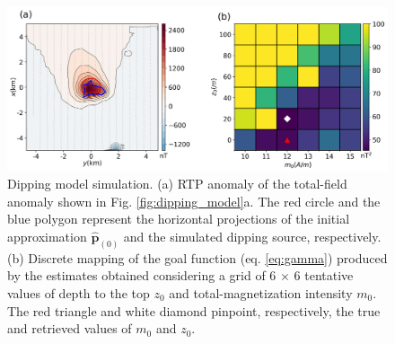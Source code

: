 \begin{figure}
    \centering
    \includegraphics[width=\linewidth]{figures/inclined_rtp.png}
    \caption{Dipping model simulation. (a) RTP anomaly of the total-field anomaly shown in 
	Fig. \ref{fig:dipping_model}a. 
	The red circle and the blue polygon represent the horizontal projections of the 	   initial approximation $\hat{\mathbf{p}}_{(0)}$ and  the simulated dipping source, respectively.
	(b) Discrete mapping of the goal function (eq. \ref{eq:gamma}) produced by the estimates   	       obtained considering a grid of 6 $\times$ 6 tentative values of 
	   depth to the top $z_0$ and total-magnetization intensity $m_0$. 
	   The red triangle  and white diamond pinpoint, respectively, the true and retrieved 	   
	   values of $m_0$  and $z_0$.     
}
    \label{fig:dipping_rtp}
\end{figure}


